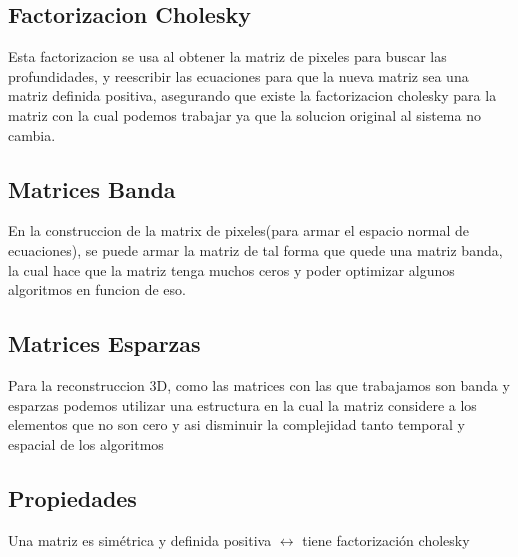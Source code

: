\subsection{Factorizacion Cholesky}
Esta factorizacion se usa al obtener la matriz de pixeles para buscar las profundidades, y reescribir las ecuaciones para que la nueva matriz sea una matriz definida positiva, asegurando que existe la factorizacion cholesky para la matriz con la cual podemos trabajar ya que la solucion original al sistema no cambia.

\subsection{Matrices Banda}
En la construccion de la matrix de pixeles(para armar el espacio normal de ecuaciones), se puede armar la matriz de tal forma que quede una matriz banda, la cual hace que la matriz tenga muchos ceros y poder optimizar algunos algoritmos en funcion de eso.


\subsection{Matrices Esparzas}
Para la reconstruccion 3D, como las matrices con las que trabajamos son banda y esparzas podemos utilizar una estructura en la cual la matriz considere a los elementos que no son cero y asi disminuir la complejidad tanto temporal y espacial de los algoritmos 

\subsection{Propiedades}
Una matriz es simétrica y definida positiva $\leftrightarrow$ tiene factorización cholesky

